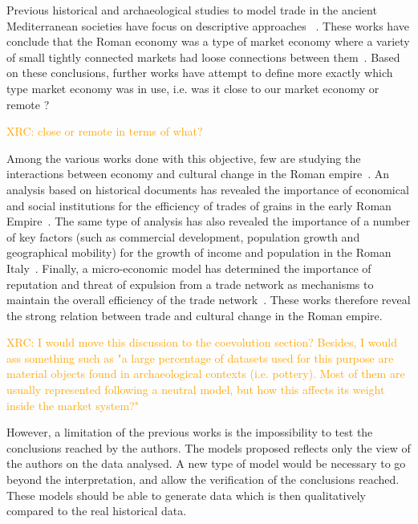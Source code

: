 \documentclass{wscpaperproc}
\newcommand{\memo}[2]{\textcolor{#1}{#2}}
\newcommand{\xrc}[1]{\memo{orange}{XRC: #1\\}}
\begin{document}
Previous historical and archaeological studies to model trade in the ancient Mediterranean societies have focus on descriptive approaches ~\cite{hopkins_taxes_1980,temin_market_2001,terpstra_trade_2011,temin_economy_2006,wilson_approaches_2009,scheidel_model_2007,kessler_organization_2007}. 
These works have conclude that the Roman economy was a type of market economy where a variety of small tightly connected markets had loose connections between them~\cite{temin_market_2001,temin_economy_2006,wilson_approaches_2009}. 
Based on these conclusions, further works have attempt to define more exactly which type market economy was in use, i.e. was it close to our market economy or remote ? 

\xrc{close or remote in terms of what?}

Among the various works done with this objective, few are studying the interactions between economy and cultural change in the Roman empire~\cite{terpstra_trade_2011,kessler_organization_2007,scheidel_model_2007}. 
An analysis based on historical documents has revealed the importance of economical and social institutions for the efficiency of trades of grains in the early Roman Empire~\cite{kessler_organization_2007}. The same type of analysis has also revealed the importance of a number of key factors (such as commercial development, population growth and geographical mobility) for the growth of income and population in the Roman Italy~\cite{scheidel_model_2007}. Finally, a micro-economic model has determined the importance of reputation and threat of expulsion from a trade network as mechanisms to maintain the overall efficiency of the trade network~\cite{terpstra_trade_2011}. These works therefore reveal the strong relation between trade and cultural change in the Roman empire.

\xrc{I would move this discussion to the coevolution section? Besides, I would ass something such as "a large percentage of datasets used for this purpose are material objects found in archaeological contexts (i.e. pottery). Most of them are usually represented following a neutral model, but how this affects its weight inside the market system?"}

However, a limitation of the previous works is the impossibility to test the conclusions reached by the authors. The models proposed reflects only the view of the authors on the data analysed. A new type of model would be necessary to go beyond the interpretation, and allow the verification of the conclusions reached. These models should be able to generate data which is then qualitatively compared to the real historical data. 
\end{document}

